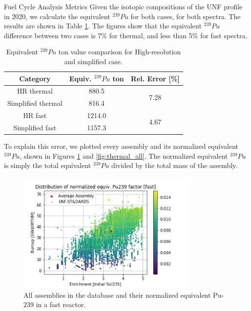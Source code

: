\documentclass[final]{beamer}
\newlength{\onecolwid}
\newlength{\threecolwid}
\begin{document}
\begin{frame}[t]
\begin{columns}[t,totalwidth=\threecolwid]

\begin{column}{\onecolwid} %


\begin{block}{Fuel Cycle Analysis Metrics}
Given the isotopic compositions of the \gls{UNF} profile in 2020,
we calculate the equivalent $^{239}Pu$ for both cases, for
both spectra. The results are shown in Table \ref{tab:equiv}.
The figures show that the equivalent
$^{239}Pu$ difference between two cases is 7\% for thermal,
and less than 5\% for fast spectra.

\begin{table}[h]
    \centering
    \begin{tabular}{ccc}
        \hline
        Category & Equiv. $^{239}Pu$ ton & Rel. Error [\%] \\
        \hline
        HR thermal & 880.5 & \multirow{2}{*}{7.28}\\
        Simplified thermal & 816.4\\
        \hline
        HR fast & 1214.0 & \multirow{2}{*}{4.67}\\
        Simplified fast & 1157.3 &\\
        \hline
    \end{tabular}
    \caption{Equivalent $^{239}Pu$ ton value comparison for High-resolution and simplified case.}
    \label{tab:equiv}
\end{table}


To explain this error, we plotted every assembly and its
normalized equivalent $^{239}Pu$, shown in Figures \ref{fig:fast_all} and \ref{fig:thermal_all}.
The normalized equivalent $^{239}Pu$ is simply the 
total equivalent $^{239}Pu$ divided by the total mass
of the assembly.

\begin{figure}
    \centering
    \includegraphics[width=0.8\textwidth]{../images/fast_all.png}
    \caption{All assemblies in the database and their normalized equivalent Pu-239 in a fast reactor.}
    \label{fig:fast_all}
\end{figure}


\end{block}
\end{column}
\end{columns}
\end{frame}
\end{document}
